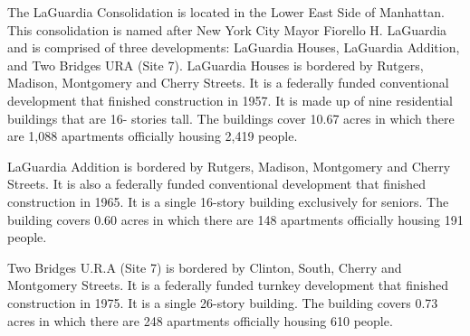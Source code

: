    

 

The LaGuardia Consolidation is located in the Lower East Side of Manhattan. This consolidation is named after New York City Mayor Fiorello H. LaGuardia and is comprised of three developments: LaGuardia Houses, LaGuardia Addition, and Two Bridges URA (Site 7). LaGuardia Houses is bordered by Rutgers, Madison, Montgomery and Cherry Streets. It is a federally funded conventional development that finished construction in 1957. It is made up of nine residential buildings that are 16- stories tall. The buildings cover 10.67 acres in which there are 1,088 apartments officially housing 2,419 people.    

   

LaGuardia Addition is bordered by Rutgers, Madison, Montgomery and Cherry Streets. It is also a federally funded conventional development that finished construction in 1965. It is a single 16-story building exclusively for seniors. The building covers 0.60 acres in which there are 148 apartments officially housing 191 people.    

Two Bridges U.R.A (Site 7) is bordered by Clinton, South, Cherry and Montgomery Streets. It is a federally funded turnkey development that finished construction in 1975. It is a single 26-story building. The building covers 0.73 acres in which there are 248 apartments officially housing 610 people.    